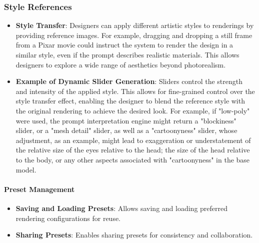 \documentclass[12pt]{article}
\begin{document}
\subsubsection{Style References}
\begin{itemize}
\item \textbf{Style Transfer}: Designers can apply different artistic styles to renderings by providing reference images. For example, dragging and dropping a still frame from a Pixar movie could instruct the system to render the design in a similar style, even if the prompt describes realistic materials. This allows designers to explore a wide range of aesthetics beyond photorealism.
\item \textbf{Example of Dynamic Slider Generation}: Sliders control the strength and intensity of the applied style. This allows for fine-grained control over the style transfer effect, enabling the designer to blend the reference style with the original rendering to achieve the desired look. For example, if "low-poly" were used, the prompt interpretation engine might return a "blockiness" slider, or a "mesh detail" slider, as well as a "cartoonyness" slider, whose adjustment, as an example, might lead to exaggeration or understatement of the relative size of the eyes relative to the head; the size of the head relative to the body, or any other aspects associated with "cartoonyness" in the base model. 
\end{itemize}


\paragraph{Preset Management}

\begin{itemize}
    \item \textbf{Saving and Loading Presets}: Allows saving and loading preferred rendering configurations for reuse.
    \item \textbf{Sharing Presets}: Enables sharing presets for consistency and collaboration.
\end{itemize}
\end{document}
